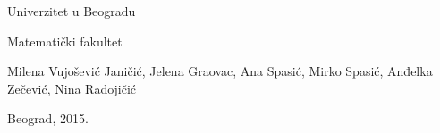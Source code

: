 \pagestyle{empty}

\begin{center}
{\sffamily

{\fontsize{16pt}{19pt}\selectfont Univerzitet u Beogradu}

{\fontsize{16pt}{19pt}\selectfont Matematički fakultet}
\vspace{150pt}

{\fontsize{16pt}{19pt}\selectfont Milena Vujošević Janičić, Jelena Graovac, Ana Spasić, Mirko Spasić, Anđelka Zečević, Nina Radojičić}

\vspace{50pt}
{\fontsize{22pt}{26pt}\selectfont {Zbirka programa}}

\vspace{230pt}


{\fontsize{14pt}{17pt}\selectfont Beograd, 2015.}
}
\end{center}
